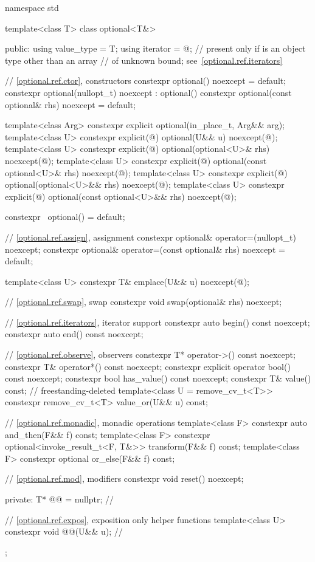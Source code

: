 \begin{codeblock}
namespace std {
  template<class T>
  class optional<T&> {
  public:
    using value_type = T;
    using iterator   = @\impdefnc@;  // present only if  is an object type other than an array
                                                // of unknown bound; see~\ref{optional.ref.iterators}

    // \ref{optional.ref.ctor}, constructors
    constexpr optional() noexcept = default;
    constexpr optional(nullopt_t) noexcept : optional() {}
    constexpr optional(const optional& rhs) noexcept = default;

    template<class Arg>
      constexpr explicit optional(in_place_t, Arg&& arg);
    template<class U>
      constexpr explicit(@\seebelow@) optional(U&& u) noexcept(@\seebelow@);
    template<class U>
      constexpr explicit(@\seebelow@) optional(optional<U>& rhs) noexcept(@\seebelow@);
    template<class U>
      constexpr explicit(@\seebelow@) optional(const optional<U>& rhs) noexcept(@\seebelow@);
    template<class U>
      constexpr explicit(@\seebelow@) optional(optional<U>&& rhs) noexcept(@\seebelow@);
    template<class U>
      constexpr explicit(@\seebelow@) optional(const optional<U>&& rhs) noexcept(@\seebelow@);

    constexpr ~optional() = default;

    // \ref{optional.ref.assign}, assignment
    constexpr optional& operator=(nullopt_t) noexcept;
    constexpr optional& operator=(const optional& rhs) noexcept = default;

    template<class U> constexpr T& emplace(U&& u) noexcept(@\seebelow@);

    // \ref{optional.ref.swap}, swap
    constexpr void swap(optional& rhs) noexcept;

    // \ref{optional.ref.iterators}, iterator support
    constexpr auto begin() const noexcept;
    constexpr auto end() const noexcept;

    // \ref{optional.ref.observe}, observers
    constexpr T*       operator->() const noexcept;
    constexpr T&       operator*() const noexcept;
    constexpr explicit operator bool() const noexcept;
    constexpr bool     has_value() const noexcept;
    constexpr T&       value() const;                           // freestanding-deleted
    template<class U = remove_cv_t<T>>
      constexpr remove_cv_t<T> value_or(U&& u) const;

    // \ref{optional.ref.monadic}, monadic operations
    template<class F> constexpr auto and_then(F&& f) const;
    template<class F> constexpr optional<invoke_result_t<F, T&>> transform(F&& f) const;
    template<class F> constexpr optional or_else(F&& f) const;

    // \ref{optional.ref.mod}, modifiers
    constexpr void reset() noexcept;

  private:
    T* @@ = nullptr;                                           // \expos

    // \ref{optional.ref.expos}, exposition only helper functions
    template<class U>
      constexpr void @@(U&& u);               // \expos
  };
}
\end{codeblock}

